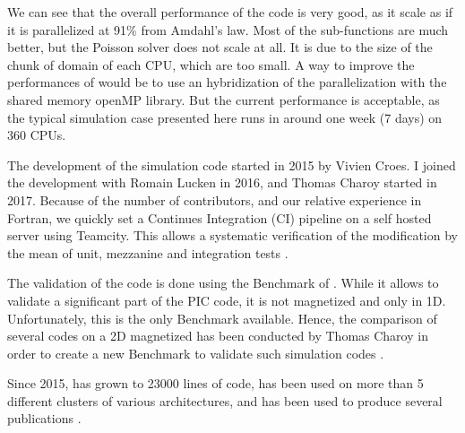 We can see that the overall performance of the code is very good, as it scale as if it is parallelized at 91\% from Amdahl's law.
Most of the sub-functions are much better, but the Poisson solver does not scale at all.
It is due to the size of the chunk of domain of each CPU, which are too small.
A way to improve the performances of \LPPic would be to use an hybridization of the parallelization with the shared memory openMP library.
But the current performance is acceptable, as the typical simulation case presented here runs in around one week (7 days) on 360 CPUs.

\vspace{1em}

The development of the  simulation code \LPPic started in 2015 by Vivien Croes.
I joined the development with Romain Lucken in 2016, and Thomas Charoy started in 2017.
Because of the number of contributors, and our relative experience in Fortran, we quickly set a Continues Integration (CI) pipeline on a self hosted server using Teamcity.
This allows a systematic verification of the modification by the mean of unit, mezzanine and integration tests \citep{turner2016}.

The validation of the code is done using the Benchmark of \citet{turner2013}.
While it allows to validate a significant part of the \ac{PIC} code, it is not magnetized and only in \ac{1D}.
Unfortunately, this is the only Benchmark available.
Hence, the comparison of several codes on a \ac{2D} magnetized  has been conducted by Thomas Charoy in order to create a new Benchmark to validate such simulation codes \citep{charoy2019}.


Since 2015, \LPPic has grown to 23000 lines of code, has been used on more than 5 different clusters of various architectures, and has been used to produce several publications \citep{croes2017a,croes2018,tavant2018,tavant2019,lucken2018,lucken2019}.
